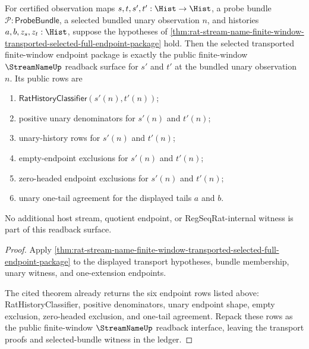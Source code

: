 \begin{theorem}
\label{thm:streamname-transported-window-public-readback}
For certified observation maps $s,t,s',t':\Hist\to\Hist$, a probe bundle
$\mathcal{P}:\mathsf{ProbeBundle}$, a selected bundled unary observation $n$,
and histories $a,b,z_s,z_t:\Hist$, suppose the hypotheses of
\autoref{thm:rat-stream-name-finite-window-transported-selected-full-endpoint-package}
hold. Then the selected transported finite-window endpoint package is exactly
the public finite-window $\StreamNameUp$ readback surface for $s'$ and $t'$ at
the bundled unary observation $n$. Its public rows are
\begin{enumerate}
  \item $\mathsf{RatHistoryClassifier}(s'(n),t'(n))$;
  \item positive unary denominators for $s'(n)$ and $t'(n)$;
  \item unary-history rows for $s'(n)$ and $t'(n)$;
  \item empty-endpoint exclusions for $s'(n)$ and $t'(n)$;
  \item zero-headed endpoint exclusions for $s'(n)$ and $t'(n)$;
  \item unary one-tail agreement for the displayed tails $a$ and $b$.
\end{enumerate}
No additional host stream, quotient endpoint, or RegSeqRat-internal witness is
part of this readback surface.
\end{theorem}
\begin{proof}
Apply
\autoref{thm:rat-stream-name-finite-window-transported-selected-full-endpoint-package}
to the displayed transport hypotheses, bundle membership, unary witness, and
one-extension endpoints.

The cited theorem already returns the six endpoint rows listed above:
RatHistoryClassifier, positive denominators, unary endpoint shape, empty
exclusion, zero-headed exclusion, and one-tail agreement. Repack these rows as
the public finite-window $\StreamNameUp$ readback interface, leaving the
transport proofs and selected-bundle witness in the ledger.
\end{proof}

